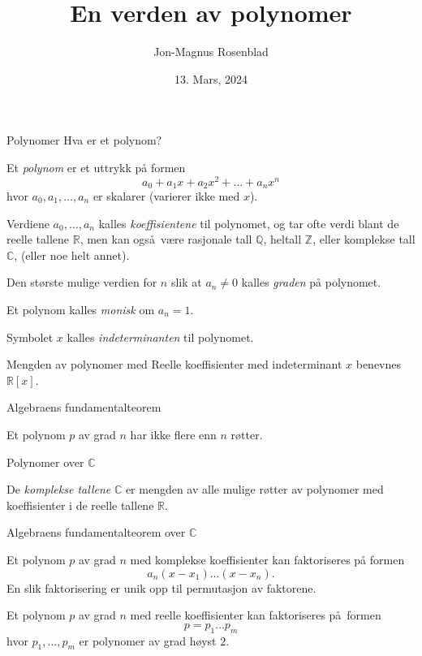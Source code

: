 \documentclass[norsk]{beamer}
\title{En verden av polynomer}
\author{Jon-Magnus Rosenblad}
\date{13. Mars, 2024}
\begin{document}
\frame{\titlepage}

\begin{frame}{Polynomer}
    Hva er et polynom?
    \begin{definition}
        Et \textit{polynom} er et uttrykk på formen
        \[
            a_0 + a_1 x + a_2 x^2 + \dots + a_n x^n
        \]
        hvor $a_0, a_1, \dots, a_n$ er skalarer (varierer ikke med $x$).

        Verdiene $a_0,\dots, a_n$ kalles \textit{koeffisientene} til polynomet,
        og tar ofte verdi blant de reelle tallene $\mathbb R$,
        men kan også være rasjonale tall $\mathbb Q$,
        heltall $\mathbb Z$,
        eller komplekse tall $\mathbb C$,
        (eller noe helt annet).

        Den største mulige verdien for $n$ slik at $a_n \neq 0$ kalles
        \textit{graden} på polynomet.

        Et polynom kalles \textit{monisk} om $a_n = 1$.

        Symbolet $x$ kalles \textit{indeterminanten} til polynomet.

        Mengden av polynomer med Reelle koeffisienter med indeterminant $x$
        benevnes $\mathbb R[x]$.
    \end{definition}
\end{frame}

\begin{frame}{Algebraens fundamentalteorem}
    \begin{theorem}
        Et polynom $p$ av grad $n$ har ikke flere enn $n$ røtter.
    \end{theorem}
\end{frame}

\begin{frame}{Polynomer over $\mathbb C$}
    \begin{definition}
        De \textit{komplekse tallene} $\mathbb C$ er mengden av
        alle mulige røtter av polynomer med koeffisienter i
        de reelle tallene $\mathbb R$.
    \end{definition}
\end{frame}

\begin{frame}{Algebraens fundamentalteorem over $\mathbb C$}
    \begin{theorem}
        Et polynom $p$ av grad $n$ med komplekse koeffisienter kan faktoriseres
        på formen
        \[
            a_n (x - x_1)\dots(x - x_n).
        \]
        En slik faktorisering er unik opp til permutasjon av faktorene.
    \end{theorem}
    \begin{corollary}
        Et polynom $p$ av grad $n$ med reelle koeffisienter kan
        faktoriseres på formen
        \[
            p = p_1\dots p_m
        \]
        hvor $p_1,\dots, p_m$ er polynomer av grad høyst $2$.
    \end{corollary}
\end{frame}
\end{document}
